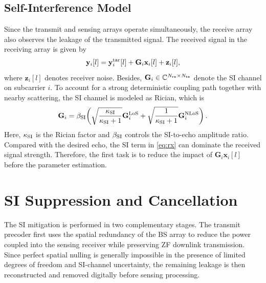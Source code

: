 \documentclass[conference]{IEEEtran}
\begin{document}
\subsection{Self-Interference Model}
Since the transmit and sensing arrays operate simultaneously, the receive array also observes the leakage of the transmitted signal. The received signal in the receiving array is given by
\begin{equation}
\mathbf{y}_i[l]=\mathbf{y}_{i}^{\rm tar}[l]+\mathbf{G}_i\mathbf{x}_i[l]+\mathbf{z}_i[l],
\label{eq:rx}
\end{equation}
where $\mathbf{z}_i[l]$ denotes receiver noise. Besides, $\mathbf{G}_i\in\mathbb{C}^{N_{\rm rx}\times N_{\rm tx}}$ denote the SI channel on subcarrier $i$. To account for a strong deterministic coupling path together with nearby scattering, the SI channel is modeled as Rician, which is
\begin{align}
\mathbf{G}_i=\beta_{\rm SI}\!\left(
\sqrt{\frac{\kappa_{\rm SI}}{\kappa_{\rm SI}+1}}\mathbf{G}_{i}^{\rm LoS}
+\sqrt{\frac{1}{\kappa_{\rm SI}+1}}\mathbf{G}_{i}^{\rm NLoS}
\right).
\label{eq:rician}
\end{align}
Here, $\kappa_{\rm SI}$ is the Rician factor and $\beta_{\rm SI}$ controls the SI-to-echo amplitude ratio. Compared with the desired echo, the SI term in \eqref{eq:rx} can dominate the received signal strength. Therefore, the first task is to reduce the impact of $\mathbf{G}_i\mathbf{x}_i[l]$ before the parameter estimation.

\section{SI Suppression and Cancellation}\label{sec:si_mitigation}
The SI mitigation is performed in two complementary stages. The transmit precoder first uses the spatial redundancy of the BS array to reduce the power coupled into the sensing receiver while preserving ZF downlink transmission. Since perfect spatial nulling is generally impossible in the presence of limited degrees of freedom and SI-channel uncertainty, the remaining leakage is then reconstructed and removed digitally before sensing processing.
\end{document}
